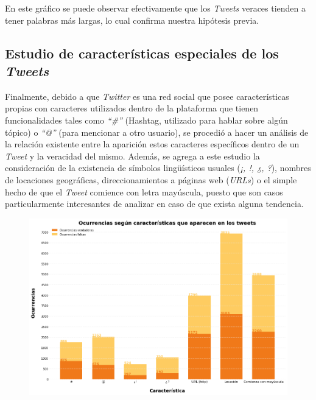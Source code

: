 \documentclass[titlepage,a4paper]{article}
\begin{document}
    En este gráfico se puede observar efectivamente que los \textit{Tweets} veraces tienden a tener palabras más largas, lo cual confirma nuestra hipótesis previa.

   \subsection{Estudio de características especiales de los \textit{Tweets}}
    
    Finalmente, debido a que \textit{Twitter} es una red social que posee características propias con caracteres utilizados dentro de la plataforma que tienen funcionalidades tales como \textit{``\#''} (Hashtag, utilizado para hablar sobre algún tópico) o \textit{``@''} (para mencionar a otro usuario), se procedió a hacer un análisis de la relación existente entre la aparición estos caracteres específicos dentro de un \textit{Tweet} y la veracidad del mismo. Además, se agrega a este estudio la consideración de la existencia de símbolos lingüísticos usuales (\textit{¡, !, ¿, ?}), nombres de locaciones geográficas, direccionamientos a páginas web (\textit{URLs}) o el simple hecho de que el \textit{Tweet} comience con letra mayúscula, puesto que son casos particularmente interesantes de analizar en caso de que exista alguna tendencia.

    \begin{figure}[H]
    \centering
    \includegraphics[width=1\textwidth]{graficos/Analisis Lexico Grafico/ocurrencias_segun_caracteristicas_que_aparecen_en_los_tweets.png}
    \caption{} 
    \end{figure}
    
\end{document}
